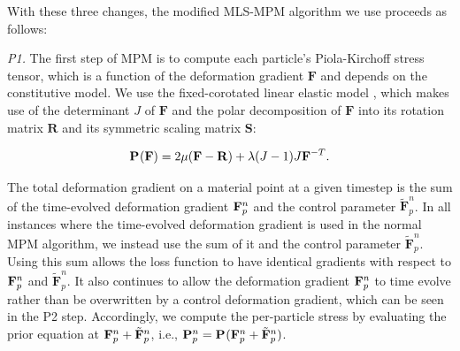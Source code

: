 With these three changes, the modified {MLS-MPM} algorithm we use proceeds as follows:



\newcommand{\Fc}[2]{\tilde{\mathbf{F}}_{#1} ^{#2} }

\newcommand{\dip}[1]{\mathbf{d}_{i p} ^{#1} }
\newcommand{\x}[2]{\mathbf{x}_{#1} ^{#2} }
\newcommand{\wip}[1]{w_{i p} ^{#1} }
\newcommand{\gridp}[1]{\mathbf{p}_i ^{#1} }
\newcommand{\dt}{\Delta t}
\newcommand{\damp}{\zeta}
\newcommand{\dx}{\Delta x}
\newcommand{\C}[2]{\mathbf{C}_{#1} ^{#2} }
\newcommand{\G}[2]{\mathbf{G}_{#1} ^{#2} }
\newcommand{\initialvol}[1]{V_{#1} ^0 }
\newcommand{\vel}[2]{\mathbf{v}_{#1} ^{#2} }
\newcommand{\fext}{\mathbf{f}_{\text{ext}} }

\emph{P1.} The first step of {MPM} is to compute each particle's Piola-Kirchoff stress tensor, which is a function of the deformation gradient $\mathbf{F}$ and depends on the constitutive model.
We use the fixed-corotated linear elastic model \citep{stomakhin2012energetically, jiang2016material}, which makes use of the determinant $J$ of $\mathbf{F}$ and the polar decomposition \citep{gast2016implicit} of $\mathbf{F}$ into its rotation matrix $\mathbf{R}$ and its symmetric scaling matrix $\mathbf{S}$:

    \begin{equation}
    \mathbf{P}_{ } ^{ }(\mathbf{F}) = 2 \mu (\mathbf{F} - \mathbf{R}) + \lambda  (J - 1)  J  \mathbf{F}^{-T} .
    \end{equation}
    
The total deformation gradient on a material point at a given timestep is the sum of the time-evolved deformation gradient $\mathbf{F}_{p} ^{n}$ and the control parameter $\Fc{p}{n}$.
In all instances where the time-evolved deformation gradient is used in the normal MPM algorithm, we instead use the sum of it and the control parameter $\Fc{p}{n}$.
Using this sum allows the loss function to have identical gradients with respect to $\mathbf{F}_{p} ^{n}$ and $\Fc{p}{n}$.
It also continues to allow the deformation gradient $\mathbf{F}_{p} ^{n}$ to time evolve rather than be overwritten by a control deformation gradient, which can be seen in the P2 step.
Accordingly, we compute the per-particle stress by evaluating the prior equation at $\F{p}{n} + \Fc{p}{n}$, i.e., $\PK{p}{n} = \PK{ }{ } (\F{p}{n} + \Fc{p}{n})$.

